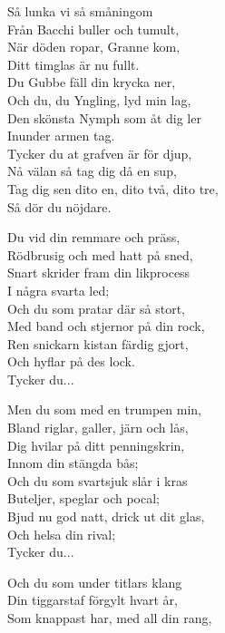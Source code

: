 \vspace{10pt}
Så lunka vi så småningom\\
Från Bacchi buller och tumult,\\
När döden ropar, Granne kom,\\
Ditt timglas är nu fullt.\\
Du Gubbe fäll din krycka ner,\\
Och du, du Yngling, lyd min lag,\\
Den skönsta Nymph som åt dig ler\\
Inunder armen tag.\\
Tycker du at grafven är för djup,\\
Nå välan så tag dig då en sup,\\
Tag dig sen dito en, dito två, dito tre,\\
Så dör du nöjdare.\par
\vspace{10pt}
Du vid din remmare och präss,\\
Rödbrusig och med hatt på sned,\\
Snart skrider fram din likprocess\\
I några svarta led;\\
Och du som pratar där så stort,\\
Med band och stjernor på din rock,\\
Ren snickarn kistan färdig gjort,\\
Och hyflar på des lock.\\
Tycker du...\par
\vspace{10pt}
Men du som med en trumpen min,\\
Bland riglar, galler, järn och lås,\\
Dig hvilar på ditt penningskrin,\\
Innom din stängda bås;\\
Och du som svartsjuk slår i kras\\
Buteljer, speglar och pocal;\\
Bjud nu god natt, drick ut dit glas,\\
Och helsa din rival;\\
Tycker du...\par
\vspace{10pt}
Och du som under titlars klang\\
Din tiggarstaf förgylt hvart år,\\
Som knappast har, med all din rang,\\
